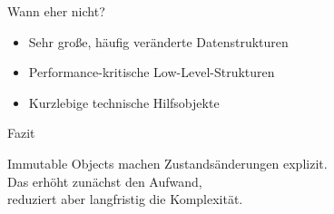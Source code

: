 \begin{frame}{Wann eher nicht?}
	\begin{itemize}
	  \item Sehr große, häufig veränderte Datenstrukturen
	  \item Performance-kritische Low-Level-Strukturen
	  \item Kurzlebige technische Hilfsobjekte
	\end{itemize}
\end{frame}

\begin{frame}{Fazit}
	\begin{block}{}
		Immutable Objects machen Zustandsänderungen explizit. \\
		Das erhöht zunächst den Aufwand, \\
		reduziert aber langfristig die Komplexität.
	\end{block}
\end{frame}


